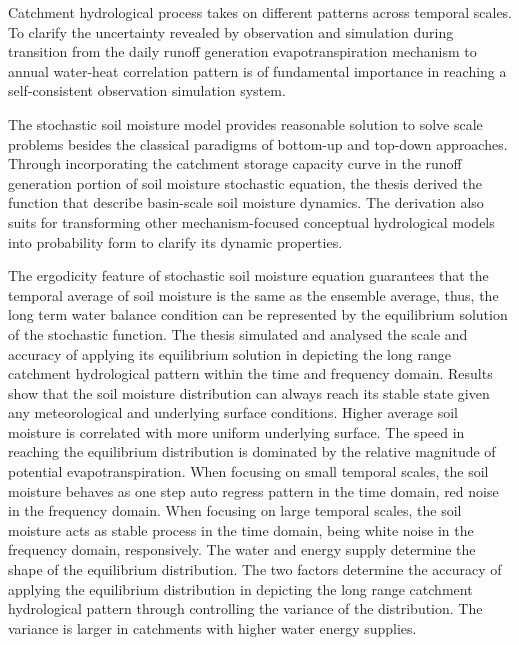 \begin{eabstract} 
Catchment hydrological process takes on different patterns across temporal scales. To clarify the uncertainty revealed by observation and simulation during transition from the daily runoff generation  evapotranspiration mechanism to annual water-heat correlation pattern is of fundamental importance in reaching a self-consistent observation simulation system. 

The stochastic soil moisture model provides reasonable solution to solve scale problems besides the classical paradigms of  bottom-up and top-down approaches. Through incorporating the catchment storage capacity curve in the runoff generation portion of soil moisture stochastic equation, the thesis derived the function that describe basin-scale soil moisture dynamics. The derivation also suits for transforming other mechanism-focused conceptual hydrological models into probability form to clarify its dynamic properties.


The ergodicity feature of stochastic soil moisture equation guarantees that the temporal average of soil moisture is the same as the ensemble average, thus, the long term water balance condition can be represented by the equilibrium solution of the stochastic function. The thesis simulated and analysed the scale and accuracy of applying its equilibrium solution  in depicting the long range catchment hydrological pattern within the time and frequency domain. Results show that the soil moisture distribution can always reach its stable state given any meteorological and underlying surface conditions. Higher average soil moisture is correlated  with  more uniform underlying surface. The speed in reaching the equilibrium distribution is dominated by the relative magnitude of potential evapotranspiration. When focusing on small temporal scales, the soil moisture behaves as one step auto regress pattern in the time domain, red noise in the frequency domain. When focusing on large temporal scales, the soil moisture acts as stable process in the time domain, being white noise in the frequency domain, responsively. The water and energy supply determine the shape of the equilibrium distribution. The two factors determine the accuracy of applying the equilibrium distribution in depicting the long range catchment hydrological pattern through controlling the variance of the distribution. The variance is larger in catchments with higher water energy supplies.
  

\end{eabstract}

